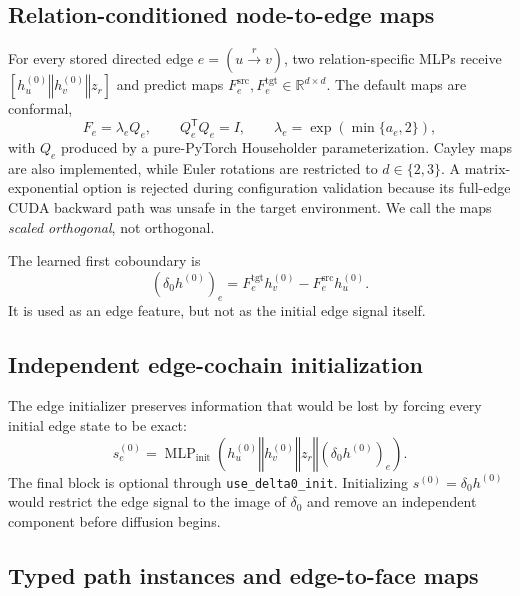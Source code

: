 \documentclass{article}
\newcommand{\R}{\mathbb{R}}
\newcommand{\transpose}{\mathsf{T}}
\newcommand{\concat}{\mathbin\Vert}
\begin{document}
\subsection{Relation-conditioned node-to-edge maps}

For every stored directed edge $e=(u\xrightarrow{r}v)$, two relation-specific MLPs receive
$[h_u^{(0)}\concat h_v^{(0)}\concat z_r]$ and predict maps
$F_e^{\mathrm{src}},F_e^{\mathrm{tgt}}\in\R^{d\times d}$. The default maps are conformal,
\begin{equation}
  F_e=\lambda_e Q_e,\qquad Q_e^{\transpose}Q_e=I,\qquad
  \lambda_e=\exp(\min\{a_e,2\}),
  \label{eq:conformal-map}
\end{equation}
with $Q_e$ produced by a pure-PyTorch Householder parameterization. Cayley maps are also
implemented, while Euler rotations are restricted to $d\in\{2,3\}$. A matrix-exponential option
is rejected during configuration validation because its full-edge CUDA backward path was unsafe in
the target environment. We call the maps \emph{scaled orthogonal}, not orthogonal.

The learned first coboundary is
\begin{equation}
  (\delta_0 h^{(0)})_e=F_e^{\mathrm{tgt}}h_v^{(0)}-
  F_e^{\mathrm{src}}h_u^{(0)}.
  \label{eq:delta0}
\end{equation}
It is used as an edge feature, but not as the initial edge signal itself.

\subsection{Independent edge-cochain initialization}

The edge initializer preserves information that would be lost by forcing every initial edge state
to be exact:
\begin{equation}
  s_e^{(0)}=\operatorname{MLP}_{\mathrm{init}}\!\left(
  h_u^{(0)}\concat h_v^{(0)}\concat z_r\concat(\delta_0h^{(0)})_e
  \right).
  \label{eq:edge-init}
\end{equation}
The final block is optional through \texttt{use\_delta0\_init}. Initializing
$s^{(0)}=\delta_0h^{(0)}$ would restrict the edge signal to the image of $\delta_0$ and remove an
independent component before diffusion begins.

\subsection{Typed path instances and edge-to-face maps}
\end{document}
